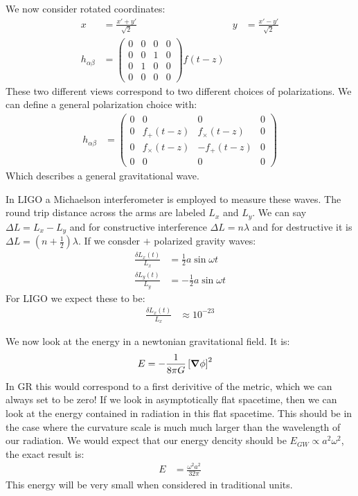  We now consider rotated coordinates:
 \begin{align*}
	 x &= \frac{x' + y'}{\sqrt{2}} & y &= \frac{x'-y'}{\sqrt{2}} \\
	h_{\alpha\beta} &= \begin{pmatrix}
		0 & 0& 0 & 0 \\
		0 & 0 & 1 & 0 \\
		0 & 1 & 0 & 0 \\
		0 & 0 & 0 & 0
	\end{pmatrix} f(t-z)
 \end{align*}
 These two different views correspond to two different choices of polarizations. We can define a general polarization choice with:
 \begin{align*}
	h_{\alpha\beta} &= \begin{pmatrix}
		0 & 0& 0 & 0 \\
		0 & f_+(t-z) & f_\times(t-z) & 0 \\
		0 & f_\times(t-z) & -f_+(t-z) & 0 \\
		0 & 0 & 0 & 0
	\end{pmatrix}
 \end{align*}
 Which describes a general gravitational wave.

 In LIGO a Michaelson interferometer is employed to measure these waves. The round trip distance across the arms are labeled $L_x$ and $L_y$. We can say $\Delta L = L_x - L_y$ and for constructive interference $\Delta L = n\lambda$ 
 and for destructive it is $\Delta L = \left(n+ \frac{1}{2}\right)\lambda$. If we consder $+$ polarized gravity waves:
 \begin{align*}
	 \frac{\delta L_x(t)}{L_x} &= \frac{1}{2}a\sin\omega t \\
	 \frac{\delta L_y(t)}{L_y} &= -\frac{1}{2}a\sin\omega t
 \end{align*}
 For LIGO we expect these to be:
 \begin{align*}
	 \frac{\delta L_x(t)}{L_x} &\approx 10^{-23}
 \end{align*}

 We now look at the energy in a newtonian gravitational field. It is:
 \begin{align*}
	 E &= -\frac{1}{8\pi G} \left[\bm{\nabla}\phi\right]^2
 \end{align*}
 In GR this would correspond to a first derivitive of the metric, which we can always set to be zero! If we look in asymptotically flat spacetime, then we can look at the energy contained in radiation in this flat spacetime.
 This should be in the case where the curvature scale is much much larger than the wavelength of our radiation.
 We would expect that our energy dencity should be $E_{GW} \propto a^2\omega^2$, the exact result is:
 \begin{align*}
	 E &= \frac{\omega^2 a^2}{32\pi}
 \end{align*}
 This energy will be very small when considered in traditional units.
